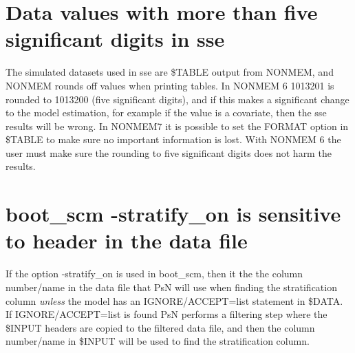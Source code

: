 \section{Data values with more than five significant digits in sse}
The simulated datasets used in sse are \$TABLE output from NONMEM, and NONMEM rounds off values when printing tables. In NONMEM 6 1013201 is rounded to 1013200 (five significant digits), and if this makes a significant change to the model estimation, for example if the value is a covariate, then the sse results will be wrong. In NONMEM7 it is possible to set the FORMAT option in \$TABLE to make sure no important information is lost. With NONMEM 6 the user must make sure the rounding to five significant digits does not harm the results.

\section{boot\_scm -stratify\_on is sensitive to header in the data file}
If the option -stratify\_on is used in boot\_scm, then it the the column number/name in the
data file that PsN will use when finding the stratification column \emph{unless} the model has 
an IGNORE/ACCEPT=list statement in \$DATA. If IGNORE/ACCEPT=list is found 
PsN performs a filtering step where the \$INPUT headers are copied
to the filtered data file, and then the column number/name in
\$INPUT will be used to find the stratification column. 


